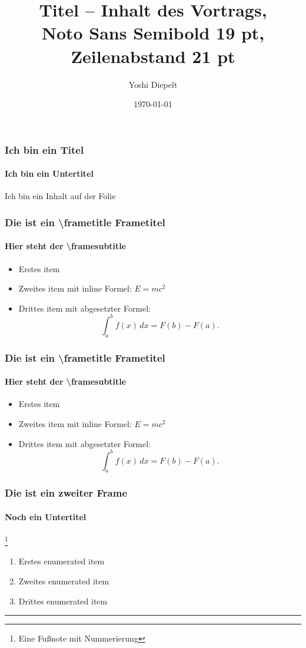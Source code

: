 \documentclass{beamer}
\title[Kurztitel der Präsentation]{Titel -- Inhalt des Vortrags, \\
Noto Sans Semibold 19 pt, \\
Zeilenabstand 21 pt}
\author[Vortragende]{Yoshi Diepelt}
\institute{Institut für Typografie}
\date{\today}
\begin{document}

\maketitle


\begin{frame}
  \frametitle{Ich bin ein Titel}
    \framesubtitle{Ich bin ein Untertitel}

    Ich bin ein Inhalt auf der Folie
\end{frame}


\begin{frame}
  \frametitle{Die ist ein \textbackslash frametitle Frametitel}
  \framesubtitle{Hier steht der \textbackslash framesubtitle}
  \lipsum[1][1-4]
  \begin{itemize}
    \item Erstes item
    \item Zweites item mit inline Formel: $E = mc^2$
    \item Drittes item mit abgesetzter Formel:
      \[
        \int_a^b f(x)\,dx = F(b) - F(a).
      \]
  \end{itemize}
\end{frame}


\begin{frame}[plain]
  \frametitle{Die ist ein \textbackslash frametitle Frametitel}
  \framesubtitle{Hier steht der \textbackslash framesubtitle}
  \lipsum[1][1-4]
  \begin{itemize}
    \item Erstes item
    \item Zweites item mit inline Formel: $E = mc^2$
    \item Drittes item mit abgesetzter Formel:
      \[
        \int_a^b f(x)\,dx = F(b) - F(a).
      \]
  \end{itemize}
\end{frame}

\begin{frame}
  \frametitle{Die ist ein zweiter Frame}
  \framesubtitle{Noch ein Untertitel}
  \lipsum[2][1-3]\footnote{Eine Fußnote mit Nummerierung}

  \begin{enumerate}
    \item Erstes enumerated item
    \item Zweites enumerated item
    \item Drittes enumerated item
  \end{enumerate}

  \rule{\textwidth}{1em}

\end{frame}
\end{document}
